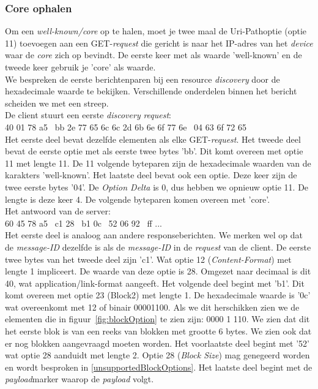 \subsubsection{Core ophalen}
Om een \textit{well-known/core} op te halen, moet je twee maal de Uri-Pathoptie (optie 11) toevoegen aan een GET-\textit{request} die gericht is naar het IP-adres van het \textit{device} waar de \textit{core} zich op bevindt. De eerste keer met als waarde 'well-known' en de tweede keer gebruik je 'core' als waarde.\\

\noindent
We bespreken de eerste berichtenparen bij een resource \textit{discovery} door de hexadecimale waarde te bekijken. Verschillende onderdelen binnen het bericht scheiden we met een streep.\\

\noindent
De client stuurt een eerste \textit{discovery} \textit{request}:\\
40 01 78 a5 \textbar~bb 2e 77 65 6c 6c 2d 6b 6e 6f 77 6e \textbar~04 63 6f 72 65\\
Het eerste deel bevat dezelfde elementen als elke GET-\textit{request}. Het tweede deel bevat de eerste optie met als eerste twee bytes 'bb'. Dit komt overeen met optie 11 met lengte 11. De 11 volgende byteparen zijn de hexadecimale waarden van de karakters 'well-known'. Het laatste deel bevat ook een optie. Deze keer zijn de twee eerste bytes '04'. De \textit{Option Delta} is 0, dus hebben we opnieuw optie 11. De lengte is deze keer 4. De volgende byteparen komen overeen met 'core'.\\

\noindent
Het antwoord van de server:\\
60 45 78 a5 \textbar~c1 28 \textbar~b1 0c \textbar~52 06 92 \textbar~ff ...\\
Het eerste deel is analoog aan andere responseberichten. We merken wel op dat de \textit{message-ID} dezelfde is als de \textit{message-ID} in de \textit{request} van de client. De eerste twee bytes van het tweede deel zijn 'c1'. Wat optie 12 (\textit{Content-Format}) met lengte 1 impliceert. De waarde van deze optie is 28. Omgezet naar decimaal is dit 40, wat application/link-format aangeeft. Het volgende deel begint met 'b1'. Dit komt overeen met optie 23 (Block2) met lengte 1. De hexadecimale waarde is '0c' wat overeenkomt met 12 of binair 00001100. Als we dit herschikken zien we de elementen die in figuur~\ref{fig:blockOption} te zien zijn: 0000 1 110. We zien dat dit het eerste blok is van een reeks van blokken met grootte 6 bytes. We zien ook dat er nog blokken aangevraagd moeten worden. Het voorlaatste deel begint met '52' wat optie 28 aanduidt met lengte 2. Optie 28 (\textit{Block Size}) mag genegeerd worden en wordt besproken in \ref{unsupportedBlockOptions}. Het laatste deel begint met de \textit{payload}marker waarop de \textit{payload} volgt.\\

